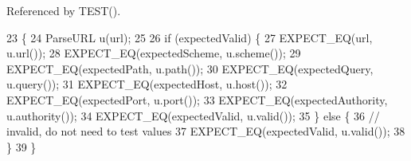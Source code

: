 Referenced by T\+E\+S\+T().


\begin{DoxyCode}
23                                                    \{
24   ParseURL u(url);
25 
26   \textcolor{keywordflow}{if} (expectedValid) \{
27     EXPECT\_EQ(url, u.url());
28     EXPECT\_EQ(expectedScheme, u.scheme());
29     EXPECT\_EQ(expectedPath, u.path());
30     EXPECT\_EQ(expectedQuery, u.query());
31     EXPECT\_EQ(expectedHost, u.host());
32     EXPECT\_EQ(expectedPort, u.port());
33     EXPECT\_EQ(expectedAuthority, u.authority());
34     EXPECT\_EQ(expectedValid, u.valid());
35   \} \textcolor{keywordflow}{else} \{
36     \textcolor{comment}{// invalid, do not need to test values}
37     EXPECT\_EQ(expectedValid, u.valid());
38   \}
39 \}
\end{DoxyCode}
